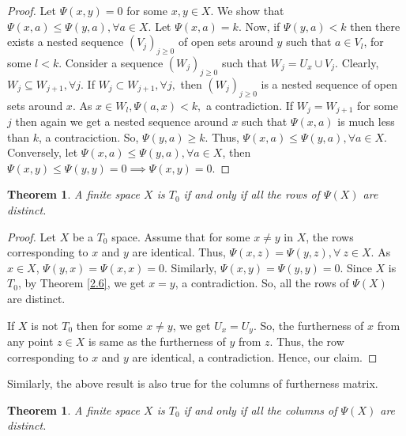 \documentclass[12pt]{amsart}
\newtheorem{theorem}[definition]{Theorem}
\begin{document}
\begin{proof}
	Let  $\Psi(x,y)=0$ for some $x,y\in X$. We show that $\Psi(x,a)\leq \Psi(y,a),\forall a\in X$. Let $\Psi(x,a)=k$. %
	Now, if $\Psi(y,a)<k$ then there exists a nested sequence $(V_j)_{j\geq 0}$ of open sets  around $y$ such that $a\in V_l$, for some $l<k$. Consider a sequence $(W_j)_{j\geq 0}$ such that $W_j= U_x \cup V_j$. %
	Clearly, $W_j\subseteq W_{j+1},\forall j$. If $W_j\subset W_{j+1},\forall j,$ then $(W_j)_{j\geq 0}$ is a nested sequence of open sets around $x$. As $x\in W_l,\Psi(a,x)<k,$ a contradiction.  If $W_j= W_{j+1}$ for some $j$ then again we get a nested sequence around $x$ such that $\Psi(x,a)$ is much less than $k$, a contraciction. So, $\Psi(y,a)\geq k$. Thus, $\Psi(x,a)\leq \Psi(y,a),\forall a\in X$. Conversely, let $\Psi(x,a)\leq \Psi(y,a),\forall a\in X$, then $\Psi(x,y)\leq \Psi(y,y)=0\implies \Psi(x,y)=0.$
\end{proof}  

\begin{theorem}
	A finite space $X$ is $T_0$ if and only if all the rows of $\Psi(X)$ are distinct.
\end{theorem}		

\begin{proof}
	Let $X$ be a $T_0$ space. Assume that for some $x\neq y$ in $X$, the rows corresponding to $x$ and $y$ are identical. Thus,  $\Psi(x,z)=\Psi(y,z),\forall ~ z\in X$. As $x\in X$, $\Psi(y,x)=\Psi(x,x)=0$. Similarly, $\Psi(x,y)=\Psi(y,y)=0$. Since $X$ is $T_0$, by Theorem \ref{2.6}, we get $x=y$, a contradiction. So, %
	all the rows of $\Psi(X)$ are distinct.\par 
	If $X$ is not $T_0$ then for some $x\neq y$, we get $U_x=U_y$. %
	So, the furtherness of $x$ from any point $z\in X$ is same as the furtherness of $y$ from $z$. Thus, the row corresponding to $x$ and $y$ are  identical, a contradiction. Hence, our claim. 
\end{proof}		

Similarly, the above result is also true for the columns of furtherness matrix. 
\begin{theorem}
	A finite space $X$ is $T_0$ if and only if all the columns of $\Psi(X)$ are distinct.
\end{theorem}
\end{document}
